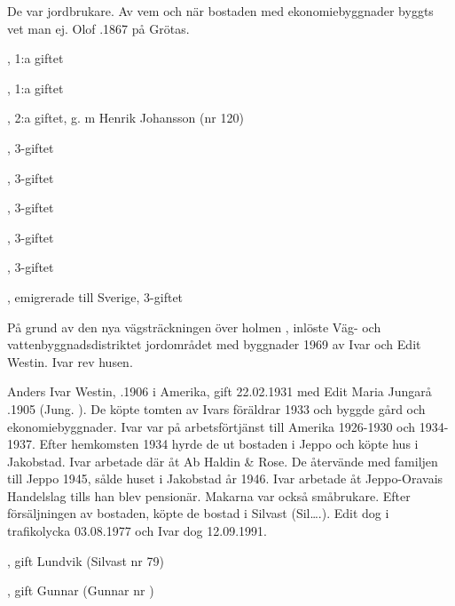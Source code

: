 De var jordbrukare. Av vem och när bostaden med ekonomiebyggnader byggts vet man ej. Olof .1867 på Grötas.
\begin{jhchildren}
  \item {}, 1:a giftet
  \item {}, 1:a giftet
  \item {}, 2:a giftet, g. m Henrik Johansson (nr 120)
  \item {}, 3-giftet
  \item {}, 3-giftet
  \item {}, 3-giftet
  \item {}, 3-giftet
  \item {}, 3-giftet
  \item {}, emigrerade till Sverige, 3-giftet
\end{jhchildren}




På grund av den nya vägsträckningen över holmen , inlöste Väg- och vattenbyggnadsdistriktet jordområdet med byggnader 1969 av Ivar och  Edit Westin.  Ivar rev husen.

Anders Ivar Westin, .1906 i Amerika, gift 22.02.1931 med Edit Maria Jungarå .1905  (Jung.       ).  De köpte tomten av  Ivars  föräldrar 1933 och byggde gård och ekonomiebyggnader. Ivar var på arbetsförtjänst till Amerika 1926-1930 och 1934-1937.  Efter hemkomsten 1934 hyrde de ut bostaden i Jeppo och köpte hus i Jakobstad. Ivar arbetade där åt Ab Haldin \& Rose. De återvände  med familjen till Jeppo 1945, sålde huset i Jakobstad år 1946. Ivar arbetade åt Jeppo-Oravais Handelslag tills han blev pensionär. Makarna var också småbrukare. Efter försäljningen av bostaden, köpte de bostad i Silvast (Sil….). Edit dog i trafikolycka 03.08.1977 och Ivar dog 12.09.1991.
\begin{jhchildren}
  \item {}, gift Lundvik (Silvast nr 79)
  \item {}, gift Gunnar (Gunnar nr  )
\end{jhchildren}



